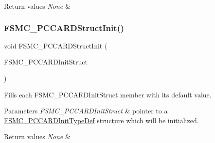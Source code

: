 \begin{DoxyRetVals}{Return values}
{\em None} & \\
\hline
\end{DoxyRetVals}
\mbox{\label{group___f_s_m_c___exported___functions_ga7a64ba0e0545b3f1913c9d1d28c05e62}} 
\subsubsection{\texorpdfstring{FSMC\_PCCARDStructInit()}{FSMC\_PCCARDStructInit()}}
{\footnotesize\ttfamily void F\+S\+M\+C\+\_\+\+P\+C\+C\+A\+R\+D\+Struct\+Init (\begin{DoxyParamCaption}\item[{\mbox{\hyperlink{struct_f_s_m_c___p_c_c_a_r_d_init_type_def}{F\+S\+M\+C\+\_\+\+P\+C\+C\+A\+R\+D\+Init\+Type\+Def}} $\ast$}]{F\+S\+M\+C\+\_\+\+P\+C\+C\+A\+R\+D\+Init\+Struct }\end{DoxyParamCaption})}



Fills each F\+S\+M\+C\+\_\+\+P\+C\+C\+A\+R\+D\+Init\+Struct member with its default value. 


\begin{DoxyParams}{Parameters}
{\em F\+S\+M\+C\+\_\+\+P\+C\+C\+A\+R\+D\+Init\+Struct} & pointer to a \mbox{\hyperlink{struct_f_s_m_c___p_c_c_a_r_d_init_type_def}{F\+S\+M\+C\+\_\+\+P\+C\+C\+A\+R\+D\+Init\+Type\+Def}} structure which will be initialized. \\
\hline
\end{DoxyParams}

\begin{DoxyRetVals}{Return values}
{\em None} & \\
\hline
\end{DoxyRetVals}
